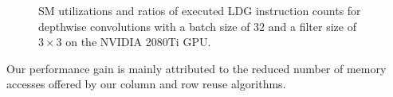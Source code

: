 \begin{figure}[t!]
    \centering
    \qquad
     \vspace{-2mm} \caption{SM utilizations and ratios of
    executed LDG instruction counts for depthwise convolutions with a batch size of 32 and a filter size of $3\times3$ on the NVIDIA 2080Ti GPU.}
    \label{fig:dwratio}
\end{figure}
Our performance gain is mainly attributed to the reduced number of memory accesses offered by our column and row reuse algorithms.

